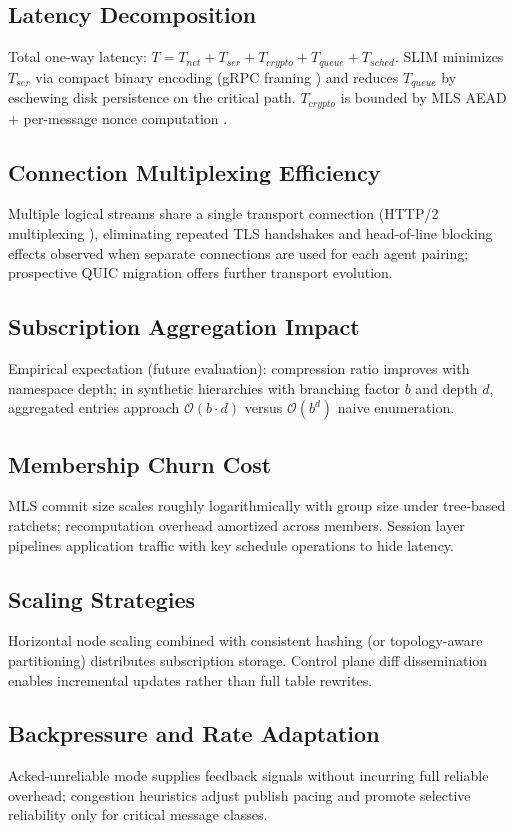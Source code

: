 \documentclass{article}
\theoremstyle{definition}
\theoremstyle{remark}
\begin{document}
\subsection{Latency Decomposition}
Total one-way latency: \( T = T_{net} + T_{ser} + T_{crypto} + T_{queue} +
T_{sched} \). SLIM minimizes \(T_{ser}\) via compact binary encoding (gRPC
framing \citep{grpc}) and reduces \(T_{queue}\) by eschewing disk persistence
on the critical path. \(T_{crypto}\) is bounded by MLS AEAD + per-message
nonce computation \citep{rfc9420}.
\subsection{Connection Multiplexing Efficiency}
Multiple logical streams share a single transport connection (HTTP/2
multiplexing \citep{http2}), eliminating repeated TLS handshakes and
head-of-line blocking effects observed when separate connections are used for
each agent pairing; prospective QUIC migration \citep{quic} offers further
transport evolution.
\subsection{Subscription Aggregation Impact}
Empirical expectation (future evaluation): compression ratio improves with
namespace depth; in synthetic hierarchies with branching factor \(b\) and
depth \(d\), aggregated entries approach \(\mathcal{O}(b \cdot d)\) versus
\(\mathcal{O}(b^d)\) naive enumeration.
\subsection{Membership Churn Cost}
MLS commit size scales roughly logarithmically with group size under
tree-based ratchets; recomputation overhead amortized across members. Session
layer pipelines application traffic with key schedule operations to hide
latency.
\subsection{Scaling Strategies}
Horizontal node scaling combined with consistent hashing (or topology-aware
partitioning) distributes subscription storage. Control plane diff
dissemination enables incremental updates rather than full table rewrites.
\subsection{Backpressure and Rate Adaptation}
Acked-unreliable mode supplies feedback signals without incurring full
reliable overhead; congestion heuristics adjust publish pacing and promote
selective reliability only for critical message classes.
\end{document}

